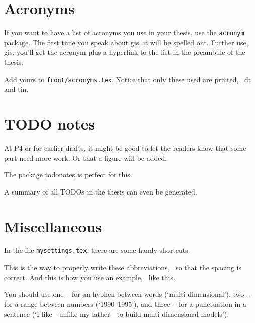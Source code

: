 %
\section{Acronyms}%
\label{sec:acronyms}

If you want to have a list of acronyms you use in your thesis, use the \texttt{acronym} package.
The first time you speak about \ac{gis}, it will be spelled out. 
Further use, \ac{gis}, you'll get the acronym plus a hyperlink to the list in the preambule of the thesis.

Add yours to \texttt{front/acronyms.tex}.
Notice that only these used are printed, \eg\ \ac{dt} and \ac{tin}.


%
\section{TODO notes}%
\label{sec:todo}

At P4 or for earlier drafts, it might be good to let the readers know that some part need more work.
Or that a figure will be added.

The package \href{http://tug.ctan.org/macros/latex/contrib/todonotes/todonotes.pdf}{todonotes} is perfect for this.

A summary of all TODOs in the thesis can even be generated.

%
\section{Miscellaneous}%
\label{sec:misc}

In the file \texttt{mysettings.tex}, there are some handy shortcuts.

This is the way to properly write these abbreviations, \ie\ so that the spacing is correct.
And this is how you use an example, \eg\ like this.

You should use one \texttt{-} for an hyphen between words (`multi-dimensional'), two \texttt{--} for a range between numbers (`1990--1995'), and three \texttt{---} for a punctuation in a sentence (`I like---unlike my father---to build multi-dimensional models').

